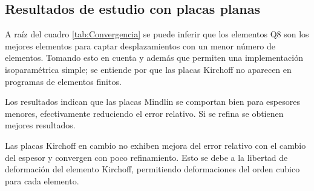\documentclass[onecolumn,10pt,titlepage]{article}
\begin{document}
\subsection{Resultados de estudio con placas planas}
A raíz del cuadro \ref{tab:Convergencia} se puede inferir que los elementos Q8 son los mejores elementos para captar desplazamientos con un menor número de elementos. Tomando esto en cuenta y además que permiten una implementación isoparamétrica simple; se entiende por que las placas Kirchoff no aparecen en programas de elementos finitos.

Los resultados indican que las placas Mindlin se comportan bien para espesores menores, efectivamente reduciendo el error relativo. Si se refina se obtienen mejores resultados.

Las placas Kirchoff en cambio no exhiben mejora del error relativo con el cambio del espesor y convergen con poco refinamiento. Esto se debe a la libertad de deformación del elemento Kirchoff, permitiendo deformaciones del orden cubico para cada elemento.
\end{document}
